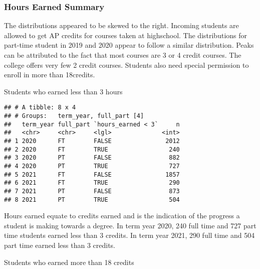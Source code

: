 \documentclass[]{article}
\newenvironment{Shaded}{\begin{snugshade}}{\end{snugshade}}
\newcommand{\DecValTok}[1]{\textcolor[rgb]{0.00,0.00,0.81}{#1}}
\newcommand{\KeywordTok}[1]{\textcolor[rgb]{0.13,0.29,0.53}{\textbf{#1}}}
\newcommand{\NormalTok}[1]{#1}
\newcommand{\OperatorTok}[1]{\textcolor[rgb]{0.81,0.36,0.00}{\textbf{#1}}}
\newcommand{\StringTok}[1]{\textcolor[rgb]{0.31,0.60,0.02}{#1}}
\begin{document}
\hypertarget{hours-earned-summary}{%
\subsubsection{Hours Earned Summary}\label{hours-earned-summary}}

The distributions appeared to be skewed to the right. Incoming students
are allowed to get AP credits for courses taken at highschool. The
distributions for part-time student in 2019 and 2020 appear to follow a
similar distribution. Peaks can be attributed to the fact that most
courses are 3 or 4 credit courses. The college offers very few 2 credit
courses. Students also need special permission to enroll in more than
18credits.

Students who earned less than 3 hours

\begin{Shaded}
\end{Shaded}

\begin{verbatim}
## # A tibble: 8 x 4
## # Groups:   term_year, full_part [4]
##   term_year full_part `hours_earned < 3`     n
##   <chr>     <chr>     <lgl>              <int>
## 1 2020      FT        FALSE               2012
## 2 2020      FT        TRUE                 240
## 3 2020      PT        FALSE                882
## 4 2020      PT        TRUE                 727
## 5 2021      FT        FALSE               1857
## 6 2021      FT        TRUE                 290
## 7 2021      PT        FALSE                873
## 8 2021      PT        TRUE                 504
\end{verbatim}

Hours earned equate to credits earned and is the indication of the
progress a student is making towards a degree. In term year 2020, 240
full time and 727 part time students earned less than 3 credits. In term
year 2021, 290 full time and 504 part time earned less than 3 credits.

Students who earned more than 18 credits

\begin{Shaded}
\end{Shaded}
\end{document}
